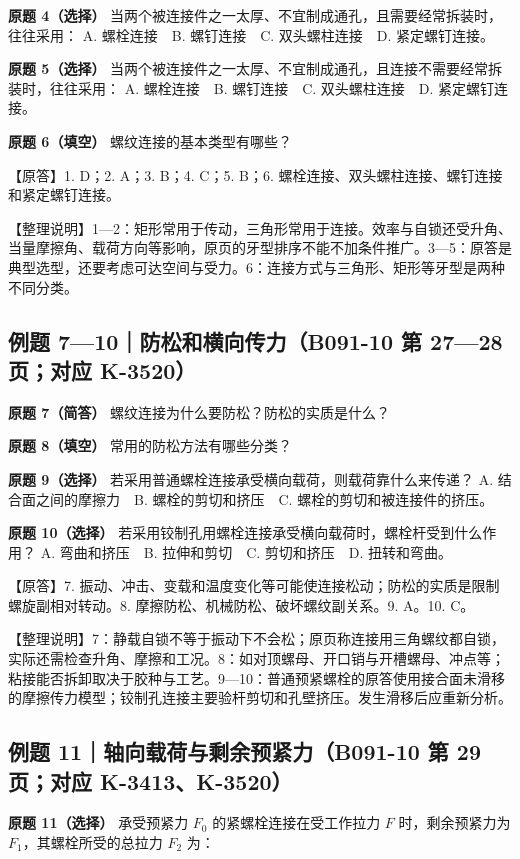 \documentclass[zihao=5,a4paper,UTF8,fontset=fandol]{ctexart}
\begin{document}
\textbf{原题 4（选择）} 当两个被连接件之一太厚、不宜制成通孔，且需要经常拆装时，往往采用：
A. 螺栓连接　B. 螺钉连接　C. 双头螺柱连接　D. 紧定螺钉连接。


\textbf{原题 5（选择）} 当两个被连接件之一太厚、不宜制成通孔，且连接不需要经常拆装时，往往采用：
A. 螺栓连接　B. 螺钉连接　C. 双头螺柱连接　D. 紧定螺钉连接。


\textbf{原题 6（填空）} 螺纹连接的基本类型有哪些？


【原答】1. D；2. A；3. B；4. C；5. B；6. 螺栓连接、双头螺柱连接、螺钉连接和紧定螺钉连接。


【整理说明】1—2：矩形常用于传动，三角形常用于连接。效率与自锁还受升角、当量摩擦角、载荷方向等影响，原页的牙型排序不能不加条件推广。3—5：原答是典型选型，还要考虑可达空间与受力。6：连接方式与三角形、矩形等牙型是两种不同分类。


\subsection{例题 7—10｜防松和横向传力（B091-10 第 27—28 页；对应 K-3520）}

\textbf{原题 7（简答）} 螺纹连接为什么要防松？防松的实质是什么？


\textbf{原题 8（填空）} 常用的防松方法有哪些分类？


\textbf{原题 9（选择）} 若采用普通螺栓连接承受横向载荷，则载荷靠什么来传递？
A. 结合面之间的摩擦力　B. 螺栓的剪切和挤压　C. 螺栓的剪切和被连接件的挤压。


\textbf{原题 10（选择）} 若采用铰制孔用螺栓连接承受横向载荷时，螺栓杆受到什么作用？
A. 弯曲和挤压　B. 拉伸和剪切　C. 剪切和挤压　D. 扭转和弯曲。


【原答】7. 振动、冲击、变载和温度变化等可能使连接松动；防松的实质是限制螺旋副相对转动。8. 摩擦防松、机械防松、破坏螺纹副关系。9. A。10. C。


【整理说明】7：静载自锁不等于振动下不会松；原页称连接用三角螺纹都自锁，实际还需检查升角、摩擦和工况。8：如对顶螺母、开口销与开槽螺母、冲点等；粘接能否拆卸取决于胶种与工艺。9—10：普通预紧螺栓的原答使用接合面未滑移的摩擦传力模型；铰制孔连接主要验杆剪切和孔壁挤压。发生滑移后应重新分析。


\subsection{例题 11｜轴向载荷与剩余预紧力（B091-10 第 29 页；对应 K-3413、K-3520）}

\textbf{原题 11（选择）} 承受预紧力 $F_0$ 的紧螺栓连接在受工作拉力 $F$ 时，剩余预紧力为 $F_1$，其螺栓所受的总拉力 $F_2$ 为：
\end{document}
